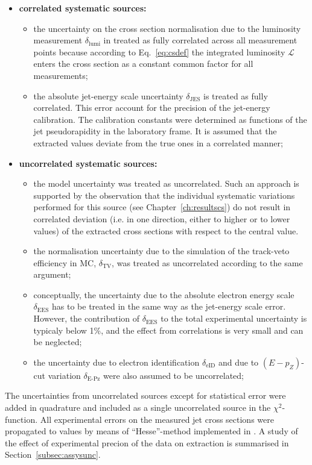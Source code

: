 \begin{itemize}
 \item \textbf{correlated systematic sources:}
 \begin{itemize}
 \item the uncertainty on the cross section normalisation due to the luminosity measurement $\delta_\text{lumi}$ in treated as fully correlated across all measurement points because according to Eq.~\eqref{eq:csdef} the integrated luminosity $\mathcal{L}$ enters the cross section as a constant common factor for all measurements;
 \item the absolute jet-energy scale uncertainty $\delta_\text{JES}$ is treated as fully correlated. This error account for the precision of the jet-energy calibration. The calibration constants were determined as functions of the jet pseudorapidity in the laboratory frame. It is assumed that the extracted values deviate from the true ones in a correlated manner;
 \end{itemize}
 \item \textbf{uncorrelated systematic sources:}
 \begin{itemize}
 \item the model uncertainty was treated as uncorrelated. Such an approach is supported by the observation that the individual systematic variations performed for this source (see Chapter~\ref{ch:resultscs}) do not result in correlated deviation (i.e. in one direction, either to higher or to lower values) of the extracted cross sections with respect to the central value.
 \item the normalisation uncertainty due to the simulation of the track-veto efficiency in MC, $\delta_\text{TV}$, was treated as uncorrelated according to the same argument;
 \item conceptually, the uncertainty due to the absolute electron energy scale $\delta_\text{EES}$ has to be treated in the same way as the jet-energy scale error. However, the contribution of $\delta_\text{EES}$ to the total experimental uncertainty is typicaly below 1\%, and the effect from correlations is very small and can be neglected;
 \item the uncertainty due to electron identification $\delta_\text{eID}$ and due to $\left(E-p_Z\right)$-cut variation $\delta_\text{E-Pz}$ were also assumed to be uncorrelated;
 \end{itemize}
\end{itemize}
The uncertainties from uncorrelated sources except for statistical error were added in quadrature and included as a single uncorrelated source in the $\chi^2$-function. All experimental errors on the measured jet cross sections were propagated to \asz values by means of ``Hesse''-method implemented in \minuit. A study of the effect of experimental precion of the data on \asz extraction is summarised in Section~\ref{subsec:assysunc}.
